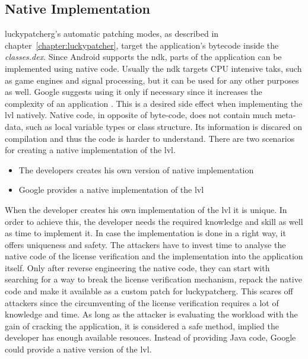 \subsection{Native Implementation} \label{subsection:counter-modifications-dynamic}
\gls{luckypatcherg}'s automatic patching modes, as described in chapter~\ref{chapter:luckypatcher}, target the application's bytecode inside the \textit{classes.dex}.
Since Android supports the \gls{ndk}, parts of the application can be implemented using native code.
\newline
Usually the \gls{ndk} targets CPU intensive taks, such as game engines and signal processing, but it can be used for any other purposes as well.
Google suggests using it only if necessary since it increases the complexity of an application \cite{androidNdk}.
This is a desired side effect when implementing the \gls{lvl} natively.
Native code, in opposite of byte-code, does not contain much meta-data, such as local variable types or class structure.
Its information is discared on compilation and thus the code is harder to understand.
\newline
There are two scenarios for creating a native implementation of the \gls{lvl}.
\begin{itemize}
  \item The developers creates his own version of native implementation
  \item Google provides a native implementation of the \gls{lvl}
\end{itemize}
When the developer creates his own implementation of the \gls{lvl} it is unique.
In order to achieve this, the developer needs the required knowledge and skill as well as time to implement it.
In case the implementation is done in a right way, it offers uniqueness and safety.
The attackers have to invest time to analyse the native code of the license verification and the implementation into the application itself.
Only after reverse engineering the native code, they can start with searching for a way to break the license verification mechanism, repack the native code and make it available as a custom patch for \gls{luckypatcherg}.
This scares off attackers since the circumventing of the license verification requires a lot of knowledge and time.
As long as the attacker is evaluating the workload with the gain of cracking the application, it is considered a safe method, implied the developer has enough available resouces. \cite{munteanLicense}
\newline
Instead of providing Java code, Google could provide a native version of the \gls{lvl}.
